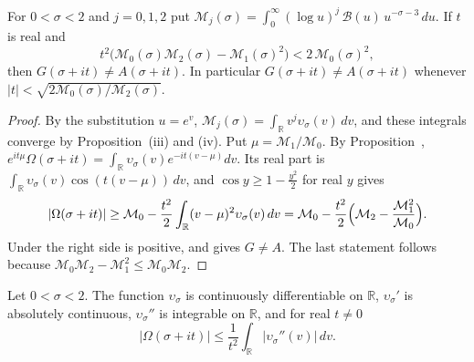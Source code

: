 \begin{theorem}[A region without solutions of $G=A$ near the real axis]\label{thm:GAexcl}
For $0<\sigma<2$ and $j=0,1,2$ put $\mathcal M_j(\sigma)=\int_0^\infty(\log u)^j\,\mathcal B(u)\,u^{-\sigma-3}\,du$. If $t$ is real and
\begin{equation}\label{eq:GAexcl}
t^2\bigl(\mathcal M_0(\sigma)\mathcal M_2(\sigma)-\mathcal M_1(\sigma)^2\bigr)<2\,\mathcal M_0(\sigma)^2,
\end{equation}
then $G(\sigma+it)\ne A(\sigma+it)$. In particular $G(\sigma+it)\ne A(\sigma+it)$ whenever $|t|<\sqrt{2\mathcal M_0(\sigma)/\mathcal M_2(\sigma)}$.
\end{theorem}

\begin{proof}
By the substitution $u=e^v$, $\mathcal M_j(\sigma)=\int_{\mathbb R}v^j\upsilon_\sigma(v)\,dv$, and these integrals converge by Proposition~\textup{(iii)} and \textup{(iv)}. Put $\mu=\mathcal M_1/\mathcal M_0$. By Proposition~, $e^{it\mu}\Omega(\sigma+it)=\int_{\mathbb R}\upsilon_\sigma(v)e^{-it(v-\mu)}dv$. Its real part is $\int_{\mathbb R}\upsilon_\sigma(v)\cos(t(v-\mu))\,dv$, and $\cos y\ge1-\frac{y^2}2$ for real $y$ gives
\begin{equation}\label{eq:Omegacos}
|\Omega(\sigma+it)|\ge\mathcal M_0-\frac{t^2}2\int_{\mathbb R}(v-\mu)^2\upsilon_\sigma(v)\,dv=\mathcal M_0-\frac{t^2}2\Bigl(\mathcal M_2-\frac{\mathcal M_1^2}{\mathcal M_0}\Bigr).
\end{equation}
Under  the right side is positive, and  gives $G\ne A$. The last statement follows because $\mathcal M_0\mathcal M_2-\mathcal M_1^2\le\mathcal M_0\mathcal M_2$.
\end{proof}

\begin{proposition}\label{prop:Omegadecay}
Let $0<\sigma<2$. The function $\upsilon_\sigma$ is continuously differentiable on $\mathbb R$, $\upsilon_\sigma'$ is absolutely continuous, $\upsilon_\sigma''$ is integrable on $\mathbb R$, and for real $t\ne0$
\begin{equation}\label{eq:Omegadecay}
|\Omega(\sigma+it)|\le\frac1{t^2}\int_{\mathbb R}|\upsilon_\sigma''(v)|\,dv .
\end{equation}
\end{proposition}

